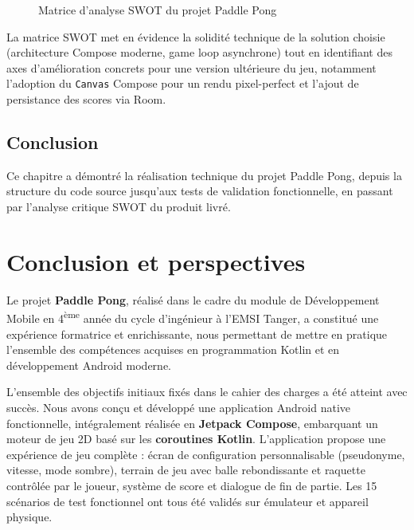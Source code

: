 \documentclass[12pt,a4paper]{report}
\begin{document}
\begin{figure}[H]
\caption{Matrice d'analyse SWOT du projet Paddle Pong}
\label{fig:swot_analysis}
\end{figure}

La matrice SWOT met en \'evidence la solidit\'e technique de la solution choisie (architecture Compose moderne, game loop asynchrone) tout en identifiant des axes d'am\'elioration concrets pour une version ult\'erieure du jeu, notamment l'adoption du \texttt{Canvas} Compose pour un rendu pixel-perfect et l'ajout de persistance des scores via Room.

\section*{Conclusion}
Ce chapitre a d\'emontr\'e la r\'ealisation technique du projet Paddle Pong, depuis la structure du code source jusqu'aux tests de validation fonctionnelle, en passant par l'analyse critique SWOT du produit livr\'e.

\newpage

\chapter*{Conclusion et perspectives}

Le projet \textbf{Paddle Pong}, r\'ealis\'e dans le cadre du module de D\'eveloppement Mobile en 4\textsuperscript{\`eme} ann\'ee du cycle d'ing\'enieur \`a l'EMSI Tanger, a constitu\'e une exp\'erience formatrice et enrichissante, nous permettant de mettre en pratique l'ensemble des comp\'etences acquises en programmation Kotlin et en d\'eveloppement Android moderne.

L'ensemble des objectifs initiaux fix\'es dans le cahier des charges a \'et\'e atteint avec succ\`es. Nous avons con\c{c}u et d\'evelopp\'e une application Android native fonctionnelle, int\'egralement r\'ealis\'ee en \textbf{Jetpack Compose}, embarquant un moteur de jeu 2D bas\'e sur les \textbf{coroutines Kotlin}. L'application propose une exp\'erience de jeu compl\`ete : \'ecran de configuration personnalisable (pseudonyme, vitesse, mode sombre), terrain de jeu avec balle rebondissante et raquette contr\^ol\'ee par le joueur, syst\`eme de score et dialogue de fin de partie. Les 15 sc\'enarios de test fonctionnel ont tous \'et\'e valid\'es sur \'emulateur et appareil physique.
\end{document}

